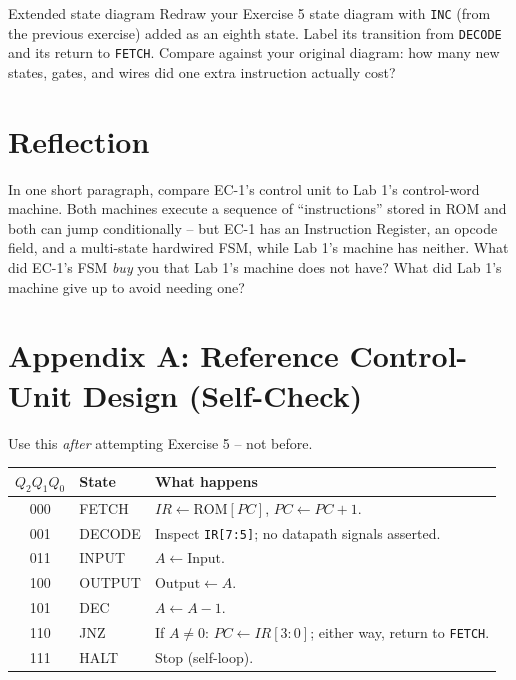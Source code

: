 \documentclass[11pt]{article}
\begin{document}
\begin{drawex}{Extended state diagram}
Redraw your Exercise 5 state diagram with \texttt{INC} (from the previous
exercise) added as an eighth state. Label its transition from \texttt{DECODE}
and its return to \texttt{FETCH}. Compare against your original diagram: how many
new states, gates, and wires did one extra instruction actually cost?
\end{drawex}

\section*{Reflection}

In one short paragraph, compare EC-1's control unit to Lab 1's control-word
machine. Both machines execute a sequence of ``instructions'' stored in ROM and
both can jump conditionally -- but EC-1 has an Instruction Register, an opcode
field, and a multi-state hardwired FSM, while Lab 1's machine has neither. What
did EC-1's FSM \emph{buy} you that Lab 1's machine does not have? What did Lab
1's machine give up to avoid needing one?

\newpage
\section*{Appendix A: Reference Control-Unit Design (Self-Check)}

Use this \emph{after} attempting Exercise 5 -- not before.

\begin{center}
\begin{tabular}{@{}clp{7.6cm}@{}}
\toprule
$Q_2Q_1Q_0$ & \textbf{State} & \textbf{What happens} \\
\midrule
000 & FETCH  & $IR \leftarrow \text{ROM}[PC]$, $PC \leftarrow PC+1$. \\
001 & DECODE & Inspect \texttt{IR[7:5]}; no datapath signals asserted. \\
011 & INPUT  & $A \leftarrow \text{Input}$. \\
100 & OUTPUT & $\text{Output} \leftarrow A$. \\
101 & DEC    & $A \leftarrow A - 1$. \\
110 & JNZ    & If $A \neq 0$: $PC \leftarrow IR[3:0]$; either way, return to \texttt{FETCH}. \\
111 & HALT   & Stop (self-loop). \\
\bottomrule
\end{tabular}
\end{center}
\end{document}
